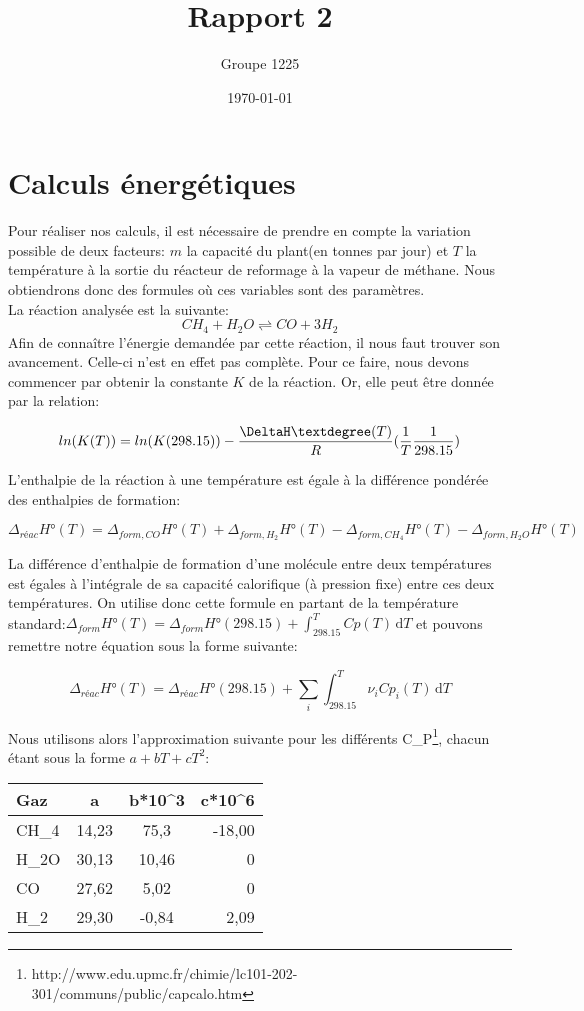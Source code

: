 \documentclass[a4paper, oneside, 12pt]{article}
\title{Rapport 2}
\author{Groupe 1225}
\date{\today}
\begin{document}
\maketitle

\section{Calculs énergétiques}

Pour réaliser nos calculs, il est nécessaire de prendre en compte la variation possible de deux facteurs: $m$ la capacité du plant(en tonnes par jour) et $T$ la température à la sortie du réacteur de reformage à la vapeur de méthane. Nous obtiendrons donc des formules où ces variables sont des paramètres.\\
La réaction analysée est la suivante:
\begin{equation}
	CH_4+H_2O \rightleftharpoons CO+3H_2
\end{equation}
Afin de connaître l'énergie demandée par cette réaction, il nous faut trouver son avancement. Celle-ci n'est en effet pas complète. Pour ce faire, nous devons commencer par obtenir la constante $K$ de la réaction. Or, elle peut être donnée par la relation:

\begin{equation}
	ln(K(T))=ln(K(298.15))-\frac{\DeltaH°(T)}{R}(\frac{1}{T}\frac{1}{298.15})
\end{equation}

L'enthalpie de la réaction à une température est égale à la différence pondérée des enthalpies de formation:

\begin{equation}
	\Delta_{réac}H°(T)=\Delta_{form,CO}H°(T)+\Delta_{form,H_2}H°(T)-\Delta_{form,CH_4}H°(T)-\Delta_{form,H_2O}H°(T)
\end{equation}

La différence d'enthalpie de formation d'une molécule entre deux températures est égales à l'intégrale de sa capacité calorifique (à pression fixe) entre ces deux températures. On utilise donc cette formule en partant de la température standard:$\Delta_{form}H°(T)= \Delta_{form}H°(298.15)+\int_298.15^T Cp(T) \, \mathrm dT$ et pouvons remettre notre équation sous la forme suivante:

\begin{equation}
	\Delta_{réac}H°(T)=\Delta_{réac}H°(298.15)+\sum_i \int_298.15^T \nu_i Cp_i(T) \, \mathrm dT
\end{equation}

Nous utilisons alors l'approximation suivante pour les différents C_P\footnote{http://www.edu.upmc.fr/chimie/lc101-202-301/communs/public/capcalo.htm}, chacun étant sous la forme $a+bT+cT^2$:\\
\begin{tabular}{|l|c|c|r|}
  \hline
  Gaz & a & b*10^3 & c*10^6 \\
  \hline
  CH_4 & 14,23 & 75,3 & -18,00\\
  H_2O & 30,13 & 10,46 & 0 \\
  CO & 27,62 & 5,02 & 0\\
  H_2 & 29,30 & -0,84 & 2,09\\
  \hline
\end{tabular}
\end{document}
